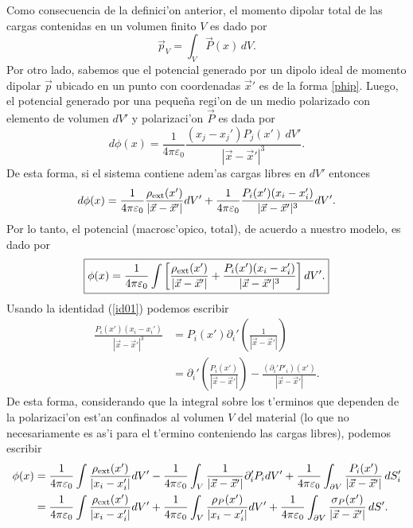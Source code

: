 Como consecuencia de la definici'on anterior, el momento dipolar
total de las cargas contenidas en un volumen finito $V$ es dado por
\begin{equation}\label{pintPdV}
 \vec{p}_V=\int_V \vec{P}(x)\,dV.
\end{equation}
Por otro lado, sabemos que el potencial generado por un dipolo ideal de momento dipolar $\vec{p}$ ubicado en un punto con coordenadas $\vec{x}'$ es de la forma \eqref{phip}. Luego, el potencial generado por una peque\~na regi'on de un medio polarizado con elemento de volumen $dV'$ y polarizaci'on $\vec{P}$ es dada por
\begin{equation}
d\phi(x)=\frac{1}{4\pi\varepsilon_0}\frac{(x_j-x_j')P_j(x')\,dV'}{|\vec{x}-\vec{
x}'|^3}.
\end{equation}
De esta forma, si el sistema contiene adem'as cargas libres en $dV'$ entonces
\begin{equation}
d\phi(x)=\frac{1}{4\pi\varepsilon_0}\frac{\rho_{\rm
ext}(x')}{|\vec{x}-\vec{x}'|}dV'+\frac {1}{
4\pi\varepsilon_0}\frac{P_i(x')(x_i-x_i')}{|\vec{x}-\vec{x}'|^3}dV'.
\end{equation}
Por lo tanto, el potencial (macrosc'opico, total), de acuerdo a nuestro modelo, es dado por
\begin{equation}
\boxed{\phi(x)=\frac{1}{4\pi\varepsilon_0}\int\left[\frac{\rho_{\rm
ext}(x')}{|\vec{x}-\vec{x}'|}+\frac{P_i(x')(x_i-x_i')}{|\vec{x}-\vec{x}'|^3}\right]dV'.}
\end{equation}
Usando la identidad (\ref{id01}) podemos escribir
\begin{align}
\frac{P_i(x')(x_i-x_i')}{|\vec{x}-\vec{x}'|^3}  &
=P_i(x')\partial_i'\left(  \frac{1}{|\vec{x}-\vec{x}'|}\right)\\
&=\partial_i'\left(\frac{P_i(x')}{|\vec{x}-\vec{x}'|}\right)-\frac{
(\partial_i'P'_i)(x')} {|\vec{x}-\vec{ x}'|}.
\end{align}
De esta forma, considerando que la integral sobre los t'erminos que dependen de la polarizaci'on est'an confinados al volumen $V$ del material (lo que no necesariamente es as'i para el t'ermino conteniendo las cargas libres), podemos escribir
\begin{align}
\phi(x)& =\frac{1}{4\pi\varepsilon_0}\int\frac{\rho_{\rm ext}(x')}{|x_i-x_i'|}dV'-\frac{1}{4\pi\varepsilon_0}\int_V\frac{1}
{|\vec{x}-\vec{x}'|}\partial_i'P_idV'+\frac{1}{4\pi\varepsilon_0}\int_{
\partial V}\frac{P_i(x')}{|\vec{x}-\vec{x}'|}\,dS'_i \\
& =\frac{1}{4\pi\varepsilon_0}\int\frac{\rho_{\rm ext}(x')}{|x_i-x_i'|}dV'+\frac{1}{4\pi\varepsilon_0}\int_V\frac{\rho_P(x')}{|x_i-x_i'|}dV'+\frac{1}{4\pi\varepsilon_0}\int_{
\partial V}\frac{\sigma_P(x')}{|\vec{x}-\vec{x}'|}\,dS' .
\end{align}
